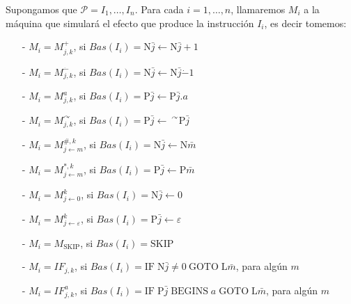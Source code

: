 \begin{frame}
  \begin{block}
    \PN Supongamos que $\mathcal{P} = I_{1}, \dotsc, I_{n}$. Para cada $i = 1, \dotsc, n$, llamaremos $M_{i}$ a la
    máquina que simulará el efecto que produce la instrucción $I_{i}$, es decir tomemos:
    \begin{enumerate}
      \item[-] $M_{i}=M_{j,k}^{+}$, si $Bas(I_{i}) = \mathrm{N}\bar{j} \leftarrow \mathrm{N}\bar{j}+1$

      \item[-] $M_{i}=M_{j,k}^{\dot{-}}$, si $Bas(I_{i}) = \mathrm{N}\bar{j} \leftarrow \mathrm{N}\bar{j}\dot{-}1$

      \item[-] $M_{i}=M_{j,k}^{a}$, si $Bas(I_{i})=\mathrm{P}\bar{j} \leftarrow \mathrm{P}\bar{j}.a$

      \item[-] $M_{i}=M_{j,k}^{\curvearrowright }$, si $Bas(I_{i}) = \mathrm{P}\bar{j} \leftarrow \
      ^{\curvearrowright}\mathrm{P}\bar{j}$

      \item[-] $M_{i}=M_{j\leftarrow m}^{\#,k}$, si $Bas(I_{i}) = \mathrm{N}\bar{j} \leftarrow \mathrm{N}\bar{m}$

      \item[-] $M_{i}=M_{j\leftarrow m}^{\ast ,k}$, si $Bas(I_{i}) = \mathrm{P}\bar{j} \leftarrow \mathrm{P}\bar{m}$

      \item[-] $M_{i}=M_{j\leftarrow 0}^{k}$, si $Bas(I_{i}) = \mathrm{N}\bar{j} \leftarrow 0$

      \item[-] $M_{i}=M_{j\leftarrow \varepsilon }^{k}$, si $Bas(I_{i}) = \mathrm{P}\bar{j} \leftarrow \varepsilon$

      \item[-] $M_{i}=M_{\mathrm{SKIP}}$, si $Bas(I_{i}) = \mathrm{SKIP}$

      \item[-] $M_{i}=IF_{j,k}$, si $Bas(I_{i})=\mathrm{IF}\;\mathrm{N}\bar{j} \neq 0 \ \mathrm{GOTO}\;
      \mathrm{L}\bar{m}$, para algún $m$

      \item[-] $M_{i}=IF_{j,k}^{a}$, si $Bas(I_{i}) = \mathrm{IF}\;\mathrm{P}\bar{j} \;\mathrm{BEGINS}\;a\;\mathrm{GOTO}
      \;\mathrm{L}\bar{m}$, para algún $m$
    \end{enumerate}
  \end{block}
\end{frame}
